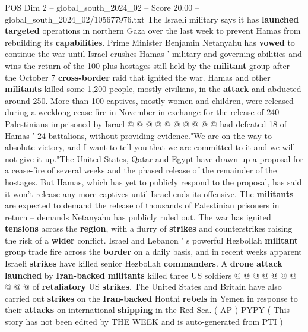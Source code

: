 \begin{textsample}{POS Dim 2 – global\_south\_2024\_02 – Score 20.00 – global\_south\_2024\_02/105677976.txt}
The Israeli military says it has \textbf{launched} \textbf{targeted} operations in northern Gaza over the last week to prevent Hamas from rebuilding its \textbf{capabilities}.
Prime Minister Benjamin Netanyahu has \textbf{vowed} to continue the war until Israel crushes Hamas ' military and governing abilities and wins the return of the 100-plus hostages still held by the \textbf{militant} group after the October 7 \textbf{cross-border} raid that ignited the war.
Hamas and other \textbf{militants} killed some 1,200 people, mostly civilians, in the \textbf{attack} and abducted around 250.
More than 100 captives, mostly women and children, were released during a weeklong cease-fire in November in exchange for the release of 240 Palestinians imprisoned by Israel @ @ @ @ @ @ @ @ @ @ had defeated 18 of Hamas ' 24 battalions, without providing evidence."We are on the way to absolute victory, and I want to tell you that we are committed to it and we will not give it up."The United States, Qatar and Egypt have drawn up a proposal for a cease-fire of several weeks and the phased release of the remainder of the hostages.
But Hamas, which has yet to publicly respond to the proposal, has said it won't release any more captives until Israel ends its offensive.
The \textbf{militants} are expected to demand the release of thousands of Palestinian prisoners in return -- demands Netanyahu has publicly ruled out.
The war has ignited \textbf{tensions} across the \textbf{region}, with a flurry of \textbf{strikes} and counterstrikes raising the risk of a \textbf{wider} conflict.
Israel and Lebanon ' s powerful Hezbollah \textbf{militant} group trade fire across the \textbf{border} on a daily basis, and in recent weeks apparent Israeli \textbf{strikes} have killed senior Hezbollah \textbf{commanders}.
A \textbf{drone} \textbf{attack} \textbf{launched} by \textbf{Iran-backed} \textbf{militants} killed three US soldiers @ @ @ @ @ @ @ @ @ @ of \textbf{retaliatory} US \textbf{strikes}.
The United States and Britain have also carried out \textbf{strikes} on the \textbf{Iran-backed} Houthi \textbf{rebels} in Yemen in response to their \textbf{attacks} on international \textbf{shipping} in the Red Sea. ( AP ) PYPY ( This story has not been edited by THE WEEK and is auto-generated from PTI )

\end{textsample}

